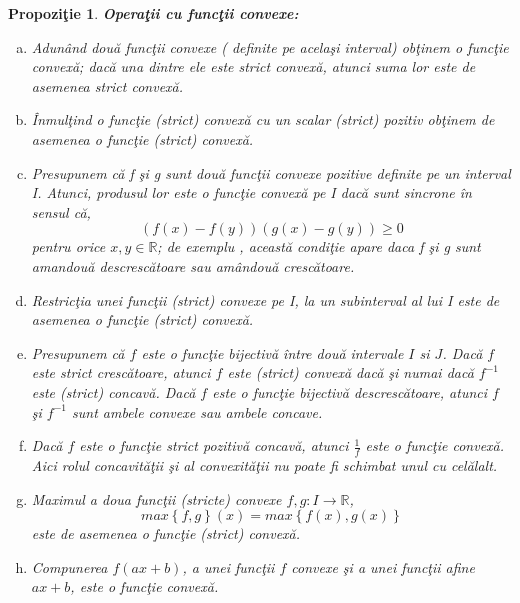 \documentclass[a4paper,12pt,oneside]{report}
\newtheorem{proposition}{Propozi\c tie}
\begin{document}
\begin{proposition}
\textbf{Opera\c{t}ii cu func\c{t}ii convexe:}
\begin{enumerate}[a)]
\item Adun\^{a}nd dou\u{a} func\c{t}ii convexe ( definite pe acela\c{s}i interval) ob\c{t}inem o func\c{t}ie convex\u{a}; dac\u{a} una dintre ele este strict convex\u{a}, atunci suma lor este de asemenea strict convex\u{a}.
\item \^{I}nmul\c{t}ind o func\c{t}ie (strict) convex\u{a} cu un scalar (strict)  pozitiv ob\c{t}inem de asemenea o func\c{t}ie (strict) convex\u{a}.
\item Presupunem c\u{a} f \c{s}i g sunt dou\u{a} func\c{t}ii convexe pozitive definite pe un interval I. Atunci, produsul lor este o func\c{t}ie convex\u{a} pe I dac\u{a} sunt sincrone \^{i}n sensul c\u{a}, \begin{displaymath}
   \left ( f\left ( x \right ) - f\left ( y \right ) \right )\left ( g\left ( x \right ) - g\left ( y \right )\right )\geq 0
\end{displaymath} pentru orice \(x , y \in \mathbb{R}\); de exemplu , aceast\u{a} condi\c{t}ie apare daca f \c{s}i g sunt amandou\u{a} descresc\u{a}toare sau am\^{a}ndou\u{a} cresc\u{a}toare.
\item Restric\c{t}ia unei func\c{t}ii (strict) convexe pe I, la un subinterval al lui I este de asemenea o func\c{t}ie (strict) convex\u{a}.
\item Presupunem c\u{a} \(f\) este o func\c{t}ie bijectiv\u{a} \^{i}ntre dou\u{a} intervale \(I\) si \(J\). Dac\u{a} \(f\) este strict cresc\u{a}toare, atunci \(f\) este (strict) convex\u{a} dac\u{a} \c{s}i numai dac\u{a} \(f^{-1}\) este (strict) concav\u{a}. Dac\u{a} \(f\) este o func\c{t}ie bijectiv\u{a} descresc\u{a}toare, atunci \(f\) \c{s}i  \(f^{-1}\) sunt ambele convexe sau ambele concave.
\item Dac\u{a} \(f\) este o func\c{t}ie strict pozitiv\u{a} concav\u{a}, atunci \(\frac{1}{f}\) este o func\c{t}ie convex\u{a}. Aici rolul concavit\u{a}\c{t}ii \c{s}i al convexit\u{a}\c{t}ii nu poate fi schimbat unul cu cel\u{a}lalt.
\item Maximul a doua func\c{t}ii (stricte) convexe \(f , g : I \rightarrow \mathbb{R}\),
\begin{displaymath}
  max \left \{ f , g \right \}\left ( x \right )=  max \left \{ f\left ( x \right ), g\left ( x \right ) \right \}
\end{displaymath} este de asemenea o func\c{t}ie (strict) convex\u{a}.
\item Compunerea \(f\left ( ax + b \right )\), a unei func\c{t}ii \(f\) convexe \c{s}i a unei func\c{t}ii afine \(ax+b\), este o func\c{t}ie convex\u{a}.
\end{enumerate}
\end{proposition}
\end{document}
